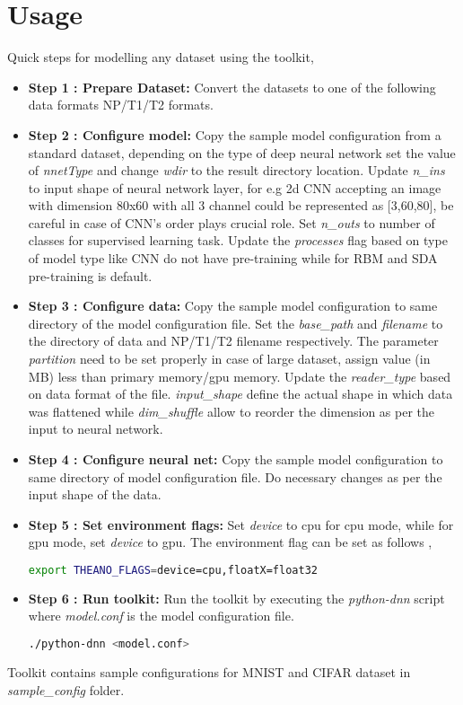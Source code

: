 \section{Usage}
Quick steps for modelling any dataset using the toolkit,
\begin{itemize}
	\item{\textbf{Step 1 : Prepare Dataset:} Convert the datasets to one of the following data formats NP/T1/T2 formats. }
	\item{\textbf{Step 2 : Configure model:} Copy the sample model configuration from a standard dataset, depending on the type of deep neural network set the value of \textit{nnetType} and change \textit{wdir} to the result directory location.  Update \textit{n\_ins} to input shape of neural network layer, for e.g 2d CNN accepting an image with dimension 80x60 with all 3 channel could be represented as [3,60,80], be careful in case of CNN's order plays crucial role.  Set \textit{n\_outs} to number of classes for supervised learning task.  Update the \textit{processes} flag based on type of model type like CNN do not have pre-training while for RBM and SDA pre-training is default.}
	\item {\textbf{Step 3 : Configure data:} Copy the sample model configuration to same directory of the model configuration file.  Set the \textit{base\_path} and \textit{filename} to the directory of data and NP/T1/T2 filename respectively.  The parameter \textit{partition} need to be set properly in case of large dataset, assign value (in MB) less than primary memory/gpu memory.  Update the \textit{reader\_type} based on data format of the file.  \textit{input\_shape} define the actual shape in which data was flattened while \textit{dim\_shuffle} allow to reorder the dimension as per the input to neural network.}
	\item{\textbf{Step 4 : Configure neural net:} Copy the sample model configuration to same directory of model configuration file. Do necessary changes as per the input shape of the data.}	
	\item{\textbf{Step 5 : Set environment flags:} Set \textit{device} to cpu for cpu mode, while for gpu mode, set \textit{device} to gpu. The environment flag can be set as follows ,
	\begin{lstlisting}[language=bash,basicstyle=\small] 
		export THEANO_FLAGS=device=cpu,floatX=float32
	\end{lstlisting}} 
	
	\item{\textbf{Step 6 : Run toolkit:} Run the toolkit by executing the \textit{python-dnn} script where \textit{model.conf} is the model configuration file.
	\begin{lstlisting}[language=bash,basicstyle=\small] 
		./python-dnn <model.conf>
	\end{lstlisting}	} 
\end{itemize}
\noindent Toolkit contains sample configurations for MNIST and CIFAR dataset in \textit{sample\_config} folder.

